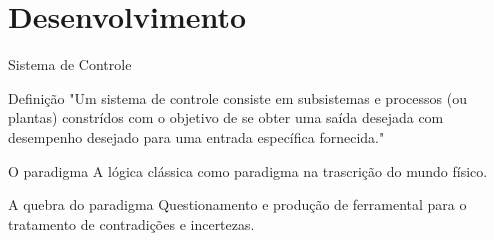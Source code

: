 \section{Desenvolvimento}

\begin{frame}{Sistema de Controle}
\begin{block}{ Definição\tiny \cite{nise2009engenharia}}
"Um sistema de controle consiste em subsistemas e processos (ou plantas) constrídos com o objetivo de se obter uma saída desejada com desempenho desejado para uma entrada específica fornecida."
\end{block}
\begin{block}{ O paradigma }
A lógica clássica como paradigma na trascrição do mundo físico.
\end{block}
\begin{block}{ A quebra do paradigma }
Questionamento e produção de ferramental para o tratamento de contradições e incertezas.
\end{block}

\end{frame}






